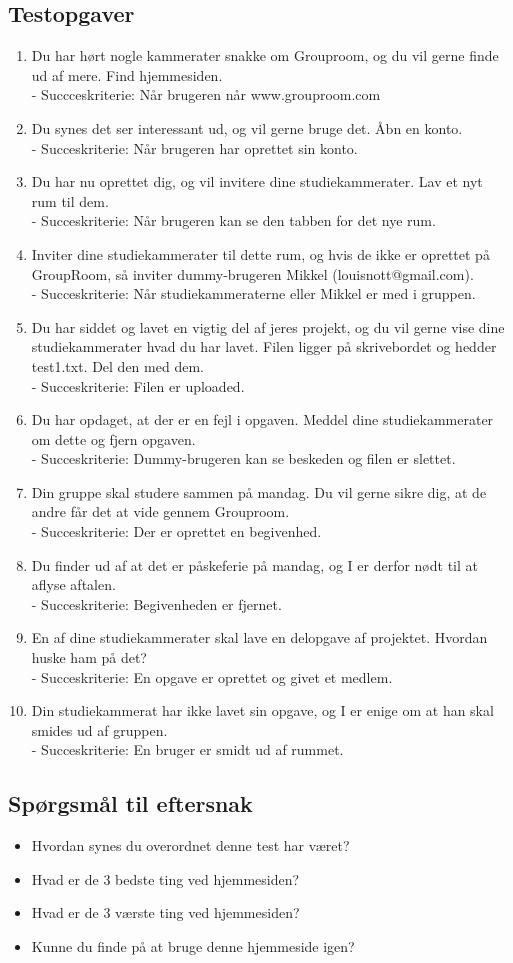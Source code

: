 \documentclass[12pt]{article}
\begin{document}
  \subsection{Testopgaver}
  \begin{enumerate}
  \item Du har hørt nogle kammerater snakke om Grouproom, og du vil gerne finde ud af mere. Find hjemmesiden.\\
  - Succceskriterie: Når brugeren når www.grouproom.com
  \item Du synes det ser interessant ud, og vil gerne bruge det. Åbn en konto.\\
  - Succeskriterie: Når brugeren har oprettet sin konto.
  \item Du har nu oprettet dig, og vil invitere dine studiekammerater. Lav et nyt rum til dem.\\
  - Succeskriterie: Når brugeren kan se den tabben for det nye rum.
  \item Inviter dine studiekammerater til dette rum, og hvis de ikke er oprettet på GroupRoom, så inviter dummy-brugeren Mikkel (louisnott@gmail.com).\\
  - Succeskriterie: Når studiekammeraterne eller Mikkel er med i gruppen.
  \item Du har siddet og lavet en vigtig del af jeres projekt, og du vil gerne vise dine studiekammerater hvad du har lavet. Filen ligger på skrivebordet og hedder test1.txt. Del den med dem.\\
  - Succeskriterie: Filen er uploaded.
  \item Du har opdaget, at der er en fejl i opgaven. Meddel dine studiekammerater om dette og fjern opgaven.\\
  - Succeskriterie: Dummy-brugeren kan se beskeden og filen er slettet.
  \item Din gruppe skal studere sammen på mandag. Du vil gerne sikre dig, at de andre får det at vide gennem Grouproom.\\
  - Succeskriterie: Der er oprettet en begivenhed.
  \item Du finder ud af at det er påskeferie på mandag, og I er derfor nødt til at aflyse aftalen.\\
  - Succeskriterie: Begivenheden er fjernet.
  \item En af dine studiekammerater skal lave en delopgave af projektet. Hvordan huske ham på det?\\
  - Succeskriterie: En opgave er oprettet og givet et medlem.
  \item Din studiekammerat har ikke lavet sin opgave, og I er enige om at han skal smides ud af gruppen.\\
  - Succeskriterie: En bruger er smidt ud af rummet.
  \end{enumerate}
  \subsection{Spørgsmål til eftersnak}
  \begin{itemize}
    \item Hvordan synes du overordnet denne test har været?
    \item Hvad er de 3 bedste ting ved hjemmesiden?
    \item Hvad er de 3 værste ting ved hjemmesiden?
    \item Kunne du finde på at bruge denne hjemmeside igen?
  \end{itemize}
\end{document}
